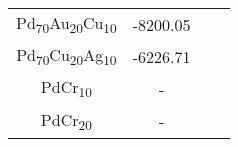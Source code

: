 \begin{table}[H]
\begin{tabular}{@{}cccc@{}}
    Pd\textsubscript{70}Au\textsubscript{20}Cu\textsubscript{10}                & -8200.05                                          \\
    Pd\textsubscript{70}Cu\textsubscript{20}Ag\textsubscript{10}                & -6226.71                                          \\ 
    PdCr\textsubscript{10}                                                      & -                                                   \\
    PdCr\textsubscript{20}                                                      & -                                                  \\
    \bottomrule
    \end{tabular}
    \end{table}

